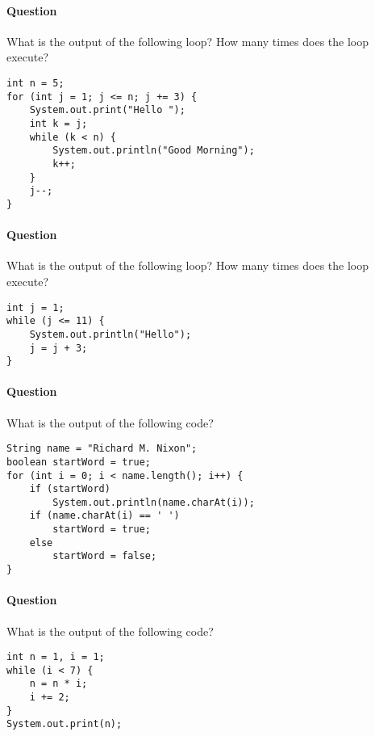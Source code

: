 \documentclass{article}
\begin{document}
\addtocounter{question_num}{1}
\paragraph{Question }
What is the output of the following loop? How many times does the loop execute?
\begin{lstlisting}
int n = 5;
for (int j = 1; j <= n; j += 3) {
	System.out.print("Hello ");
	int k = j;
	while (k < n) {
		System.out.println("Good Morning");
		k++;
	}
	j--;
}
\end{lstlisting}

\addtocounter{question_num}{1}
\paragraph{Question }
What is the output of the following loop? How many times does the loop execute?
\begin{lstlisting}
int j = 1;
while (j <= 11) {
	System.out.println("Hello");
	j = j + 3;
}
\end{lstlisting}

\addtocounter{question_num}{1}
\paragraph{Question }
What is the output of the following code?
\begin{lstlisting}
String name = "Richard M. Nixon";
boolean startWord = true;
for (int i = 0; i < name.length(); i++) {
	if (startWord)
		System.out.println(name.charAt(i));
	if (name.charAt(i) == ' ')
		startWord = true;
	else
		startWord = false;
}
\end{lstlisting}

\addtocounter{question_num}{1}
\paragraph{Question }
What is the output of the following code?
\begin{lstlisting}
int n = 1, i = 1;
while (i < 7) {
	n = n * i;
	i += 2;
}
System.out.print(n);
\end{lstlisting}
\end{document}

